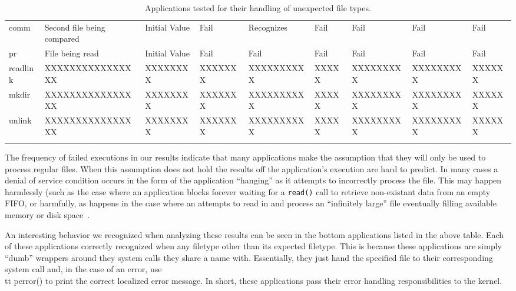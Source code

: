 \begin{table}[t]
\begin{tabular}{l  l  |  l  l  l  l  l  l  l}
        comm        & Second file being compared & Initial Value  & Fail           & Recognizes  & Fail       & Fail        & Fail       & Fail\\
        pr          & File being read            & Initial Value  & Fail           & Fail        & Fail       & Fail        & Fail       & Fail\\
        readlink    & XXXXXXXXXXXXXXXX           & XXXXXXXX       & XXXXXXX        & XXXXXXXXXX  & XXXXX      & XXXXXXXXX   & XXXXXXXXX  & XXXXXX\\
        mkdir       & XXXXXXXXXXXXXXXX           & XXXXXXXX       & XXXXXXX        & XXXXXXXXXX  & XXXXX      & XXXXXXXXX   & XXXXXXXXX  & XXXXXX\\
        unlink      & XXXXXXXXXXXXXXXX           & XXXXXXXX       & XXXXXXX        & XXXXXXXXXX  & XXXXX      & XXXXXXXXX   & XXXXXXXXX  & XXXXXX\\
    \bottomrule{}
    \end{tabular}
    \caption{Applications tested for their handling of unexpected file types.
}
    \label{table:unexpectedtypes}
\end{table}

The frequency of failed executions in our results indicate that many
applications make the assumption that they will only be used to process
regular files.  When this assumption does not hold the results off the
application's execution are hard to predict.  In many cases a denial of
service condition occurs in the form of the application ``hanging'' as it
attempts to incorrectly process the file.  This may happen harmlessly (such
as the case where an application blocks forever waiting for a {\tt read()}
call to retrieve non-existant data from an empty FIFO, or harmfully, as
happens in the case where an attempts to read in and process an
``infinitely large'' file eventually filling available memory or disk
space~\cite{Cappos_CCS_08}.  


An interesting behavior we recognized when analyzing these results can be seen
in the bottom applications listed in the above table.  Each of these
applications correctly recognized when any filetype other than its expected
filetype.  This is because these applications are simply ``dumb'' wrappers
around they system calls they share a name with.  Essentially, they just hand
the specified file to their corresponding system call and, in the case of an
error, use {\\tt perror()} to print the correct localized error message.  In
short, these applications pass their error handling responsibilities to the
kernel.

